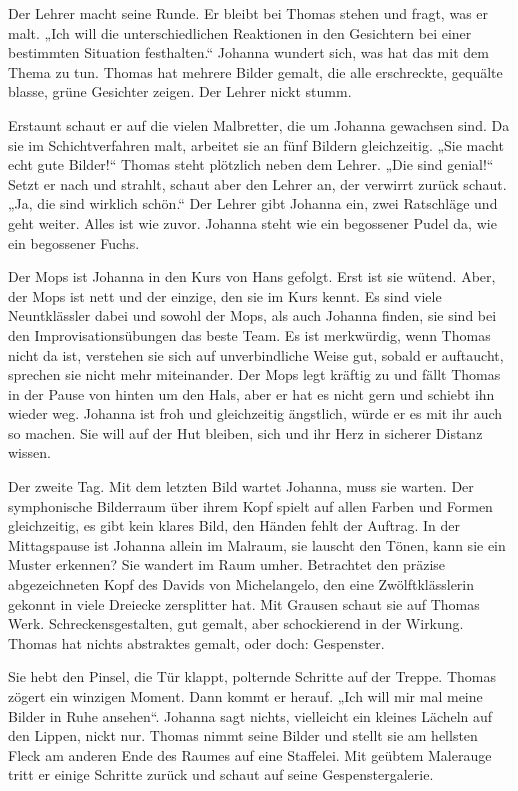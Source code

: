 \documentclass[10pt,titlepage,a5paper]{book}
\begin{document}
Der Lehrer macht seine Runde. Er bleibt bei Thomas stehen und fragt, was er malt. „Ich will die unterschiedlichen Reaktionen in den Gesichtern bei einer bestimmten Situation festhalten.“ Johanna wundert sich, was hat das mit dem Thema zu tun. Thomas hat mehrere Bilder gemalt, die alle erschreckte, gequälte blasse, grüne Gesichter zeigen. Der Lehrer nickt stumm. 

Erstaunt schaut er auf die vielen Malbretter, die um Johanna gewachsen sind. Da sie im Schichtverfahren malt, arbeitet sie an fünf Bildern gleichzeitig. „Sie macht echt gute Bilder!“ Thomas steht plötzlich neben dem Lehrer. „Die sind genial!“ Setzt er nach und strahlt, schaut aber den Lehrer an, der verwirrt zurück schaut. „Ja, die sind wirklich schön.“ Der Lehrer gibt Johanna ein, zwei Rat\-schläge und geht weiter. Alles ist wie zuvor. Johanna steht wie ein begossener Pudel da, wie ein begossener Fuchs.

Der Mops ist Johanna in den Kurs von Hans gefolgt. Erst ist sie wütend.  Aber, der Mops ist nett und der einzige, den sie im Kurs kennt. Es sind viele Neuntklässler dabei und sowohl der Mops, als auch Johanna finden, sie sind bei den Improvisationsübungen das beste Team. Es ist merkwürdig, wenn Thomas nicht da ist, verstehen sie sich auf unverbindliche Weise gut, sobald er auftaucht, sprechen sie nicht mehr miteinander. Der Mops legt kräftig zu und fällt Thomas in der Pause von hinten um den Hals, aber er hat es nicht gern und schiebt ihn wieder weg. Johanna ist froh und gleichzeitig ängstlich, würde er es mit ihr auch so machen. Sie will auf der Hut bleiben, sich und ihr Herz in sicherer Distanz wissen.

Der zweite Tag. Mit dem letzten Bild wartet Johanna, muss sie warten. Der symphonische Bilderraum über ihrem Kopf spielt auf allen Farben und Formen gleichzeitig, es gibt kein klares Bild, den Händen fehlt der Auftrag. In der Mittagspause ist Johanna allein im Malraum, sie lauscht den Tönen, kann sie ein Muster erkennen? Sie wandert im Raum umher. Betrachtet den präzise abgezeichneten Kopf des Davids von Michelangelo, den eine Zwölftklässlerin gekonnt in viele Dreiecke zersplitter hat. Mit Grausen schaut sie auf Thomas Werk. Schreckensgestalten, gut gemalt, aber schockierend in der Wirkung. Thomas hat nichts abstraktes gemalt, oder doch: Gespenster.

Sie hebt den Pinsel, die Tür klappt, polternde Schritte auf der Treppe. Thomas zögert ein winzigen Moment. Dann kommt er herauf. „Ich will mir mal meine Bilder in Ruhe ansehen“. Johanna sagt nichts, vielleicht ein kleines Lächeln auf den Lippen, nickt nur. Thomas nimmt seine Bilder und stellt sie am hellsten Fleck am anderen Ende des Raumes auf eine Staffelei. Mit geübtem Malerauge tritt er einige Schritte zurück und  schaut auf seine Gespenstergalerie.
\end{document}
